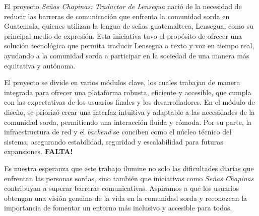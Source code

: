 El proyecto \textit{Señas Chapinas: Traductor de Lensegua} nació de la necesidad de reducir las barreras de comunicación que enfrenta la comunidad sorda en Guatemala, quienes utilizan la lengua de señas guatemalteca, Lensegua, como su principal medio de expresión. Esta iniciativa tuvo el propósito de ofrecer una solución tecnológica que permita traducir Lensegua a texto y voz en tiempo real, ayudando a la comunidad sorda a participar en la sociedad de una manera más equitativa y autónoma.

El proyecto se divide en varios módulos clave, los cuales trabajan de manera integrada para ofrecer una plataforma robusta, eficiente y accesible, que cumpla con las expectativas de los usuarios finales y los desarrolladores. En el módulo de diseño, se priorizó crear una interfaz intuitiva y adaptable a las necesidades de la comunidad sorda, permitiendo una interacción fluida y cómoda. Por su parte, la infraestructura de red y el \textit{backend} se conciben como el núcleo técnico del sistema, asegurando estabilidad, seguridad y escalabilidad para futuras expansiones. \textbf{FALTA!}


Es nuestra esperanza que este trabajo ilumine no solo las dificultades diarias que enfrentan las personas sordas, sino también que iniciativas como \textit{Señas Chapinas} contribuyan a superar barreras comunicativas. Aspiramos a que los usuarios obtengan una visión genuina de la vida en la comunidad sorda y reconozcan la importancia de fomentar un entorno más inclusivo y accesible para todos.

